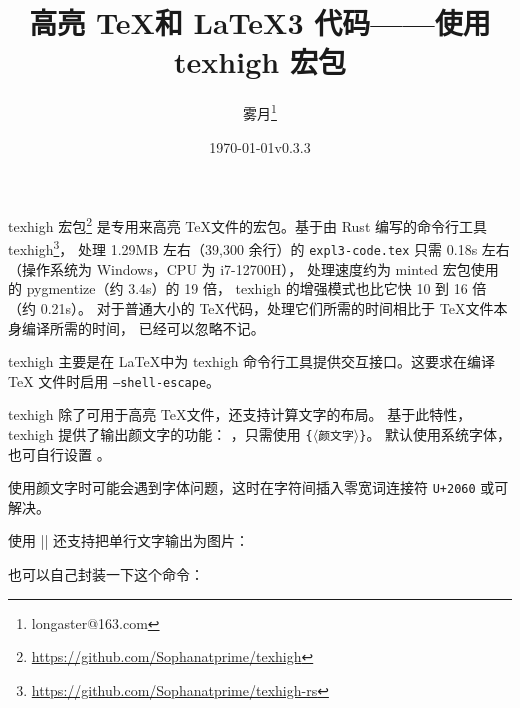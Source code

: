 \documentclass[zihao=-4,fontset=fandol]{ctexart}
\begin{document}
\title{高亮 \TeX 和 \LaTeX3 代码——使用\textsf{texhigh} 宏包}
\author{雾月\thanks{longaster@163.com}}
\date{\today\quad v0.3.3}
\maketitle

\textsf{texhigh} 宏包\footnote{\url{https://github.com/Sophanatprime/texhigh}}%
是专用来高亮 \TeX 文件的宏包。基于由 Rust 编写的命令行工具
texhigh\footnote{\url{https://github.com/Sophanatprime/texhigh-rs}}，
处理 1.29MB 左右（39,300 余行）的 \texttt{expl3-code.tex} 只需 0.18s 左右
（操作系统为 Windows，CPU 为 i7-12700H），
处理速度约为 \textsf{minted} 宏包使用的 pygmentize（约 3.4s）的 19 倍，
texhigh 的增强模式也比它快 10 到 16 倍（约 0.21s）。
对于普通大小的 \TeX 代码，处理它们所需的时间相比于 \TeX 文件本身编译所需的时间，
已经可以忽略不记。

\textsf{texhigh} 主要是在 \LaTeX 中为 texhigh 命令行工具提供交互接口。这要求在编译 \TeX
文件时启用 \texttt{--shell-escape}。

texhigh 除了可用于高亮 \TeX 文件，还支持计算文字的布局。
基于此特性，\textsf{texhigh} 提供了输出颜文字的功能：
 ，只需使用 \texhighverb{\kaomoji}\texttt\{\ensuremath{\langle}\verb|颜文字|\ensuremath{\rangle}\texttt\}。
默认使用系统字体，也可自行设置 。

\quad
{}\quad
{}\quad
{}\quad
{}

使用颜文字时可能会遇到字体问题，这时在字符间插入零宽词连接符 \texttt{U+2060} 或可解决。

使用 \texhighverb|\kaomoji*| 还支持把单行文字输出为图片：
\begin{examcode}[texhigh options={
  char-category*={emoji}{[\p{Emoji}--\p{ASCII}]}{\mbox{\emojifont #1}} %
}]{}

\end{examcode}

也可以自己封装一下这个命令：
\end{document}
